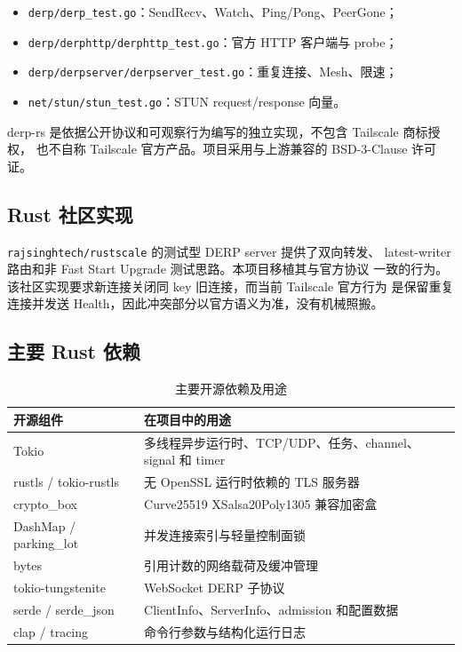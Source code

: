 \documentclass[UTF8,a4paper,zihao=-4]{ctexart}
\newcommand{\code}[1]{\texttt{\small #1}}
\begin{document}
\begin{itemize}
  \item \code{derp/derp\_test.go}：SendRecv、Watch、Ping/Pong、PeerGone；
  \item \code{derp/derphttp/derphttp\_test.go}：官方 HTTP 客户端与 probe；
  \item \code{derp/derpserver/derpserver\_test.go}：重复连接、Mesh、限速；
  \item \code{net/stun/stun\_test.go}：STUN request/response 向量。
\end{itemize}

derp-rs 是依据公开协议和可观察行为编写的独立实现，不包含 Tailscale 商标授权，
也不自称 Tailscale 官方产品。项目采用与上游兼容的 BSD-3-Clause 许可证。

\subsection{Rust 社区实现}

\code{rajsinghtech/rustscale} 的测试型 DERP server 提供了双向转发、
latest-writer 路由和非 Fast Start Upgrade 测试思路。本项目移植其与官方协议
一致的行为。该社区实现要求新连接关闭同 key 旧连接，而当前 Tailscale 官方行为
是保留重复连接并发送 Health，因此冲突部分以官方语义为准，没有机械照搬。

\subsection{主要 Rust 依赖}

\begin{table}[htbp]
\centering
\small
\begin{tabularx}{\textwidth}{p{}Y}
\toprule
\textbf{开源组件} & \textbf{在项目中的用途} \\
\midrule
Tokio & 多线程异步运行时、TCP/UDP、任务、channel、signal 和 timer \\
rustls / tokio-rustls & 无 OpenSSL 运行时依赖的 TLS 服务器 \\
crypto\_box & Curve25519 XSalsa20Poly1305 兼容加密盒 \\
DashMap / parking\_lot & 并发连接索引与轻量控制面锁 \\
bytes & 引用计数的网络载荷及缓冲管理 \\
tokio-tungstenite & WebSocket DERP 子协议 \\
serde / serde\_json & ClientInfo、ServerInfo、admission 和配置数据 \\
clap / tracing & 命令行参数与结构化运行日志 \\
\bottomrule
\end{tabularx}
\caption{主要开源依赖及用途}
\end{table}
\end{document}
